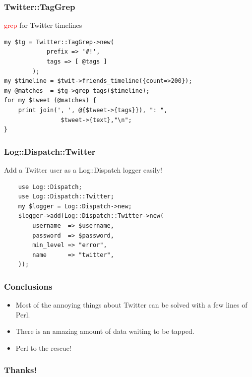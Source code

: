 \documentclass[12pt]{beamer}
\begin{document}
\begin{frame}[fragile]
    \frametitle{Twitter::TagGrep}
    \textcolor{red}{grep} for Twitter timelines
    \begin{verbatim}
my $tg = Twitter::TagGrep->new( 
            prefix => '#!',
            tags => [ @tags ] 
        );
my $timeline = $twit->friends_timeline({count=>200});
my @matches  = $tg->grep_tags($timeline);
for my $tweet (@matches) {
    print join(', ', @{$tweet->{tags}}), ": ",
                $tweet->{text},"\n";
}
    \end{verbatim}
\end{frame}


\begin{frame}[fragile]
    \frametitle{Log::Dispatch::Twitter}
    Add a Twitter user as a Log::Dispatch logger easily!
    \begin{verbatim}
    use Log::Dispatch;
    use Log::Dispatch::Twitter;
    my $logger = Log::Dispatch->new;
    $logger->add(Log::Dispatch::Twitter->new(
        username  => $username,
        password  => $password,
        min_level => "error",
        name      => "twitter",
    ));
    \end{verbatim}
\end{frame}

\begin{frame}[fragile]
    \frametitle{Conclusions}
    \begin{itemize}
    \item Most of the annoying things about Twitter can be solved with a few lines of Perl.
    \item There is an amazing amount of data waiting to be tapped.
    \item Perl to the rescue!
    \end{itemize}

\end{frame}

\begin{frame}[fragile]
    \frametitle{Thanks!}
    \begin{verbatim}
    \end{verbatim}
\end{frame}
\end{document}
